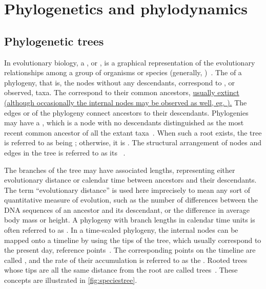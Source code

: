 \section{Phylogenetics and phylodynamics}
\label{sec:phylo}

\subsection{Phylogenetic trees}

In evolutionary biology, a , or , is a
graphical representation of the evolutionary relationships among a group of
organisms or species (generally, )~\autocite{haeckel1866generelle}.
The  of a phylogeny, that is, the nodes without any descendants,
correspond to , or observed, taxa. The 
correspond to their common ancestors, {\color{blue}\uline{usually extinct
(although occasionally the internal nodes may be observed as well, eg.
\autocite{jombart2011reconstructing}).}} The edges or  of the
phylogeny connect ancestors to their descendants. Phylogenies may have a
, which is a node with no descendants distinguished as the most
recent common ancestor of all the extant
taxa~\autocite{harding1971probabilities}. When such a root exists, the tree is
referred to as being ; otherwise, it is . The
structural arrangement of nodes and edges in the tree is referred to as its
~\autocite{cavalli1967phylogenetic}. 

The branches of the tree may have associated lengths, representing either
evolutionary distance or calendar time between ancestors and their descendants.
The term ``evolutionary distance'' is used here imprecisely to mean any sort of
quantitative measure of evolution, such as the number of differences between
the DNA sequences of an ancestor and its descendant, or the difference in
average body mass or height. A phylogeny with branch lengths in calendar time
units is often referred to as . In a time-scaled phylogeny,
the internal nodes can be mapped onto a timeline by using the tips of the tree,
which usually correspond to the present day, reference
points~\autocite{nee1992tempo}. The corresponding points on the timeline are
called , and the rate of their accumulation is referred
to as the . Rooted trees whose tips are all the same
distance from the root are called 
trees~\autocite{buneman1974note}. These concepts are illustrated in
\cref{fig:speciestree}.

